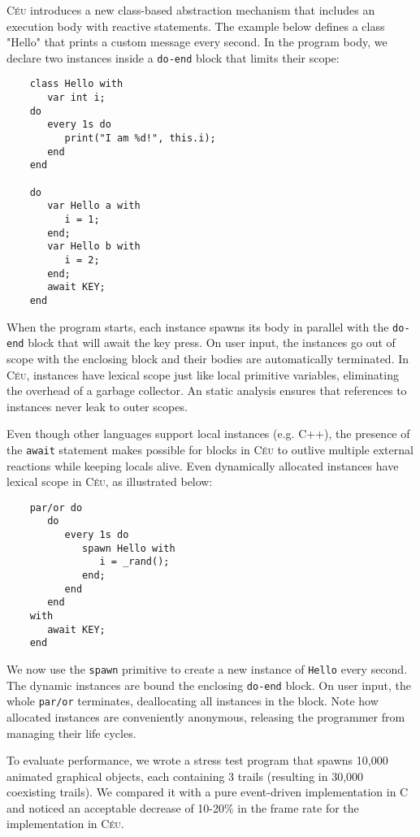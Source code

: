 \documentclass[11pt,a4paper]{article}
\newcommand{\CEU}{\textsc{C\'{e}u}\xspace}
\newcommand{\code}[1] {{\small{\texttt{#1}}}}
\begin{document}
\CEU introduces a new class-based abstraction mechanism that includes an 
execution body with reactive statements.
%
The example below defines a class "Hello" that prints a custom message every 
second.
In the program body, we declare two instances inside a \code{do-end} block that 
limits their scope:

\begin{verbatim}
    class Hello with
       var int i;
    do
       every 1s do
          print("I am %d!", this.i);
       end
    end

    do
       var Hello a with
          i = 1;
       end;
       var Hello b with
          i = 2;
       end;
       await KEY;
    end
\end{verbatim}

When the program starts, each instance spawns its body in parallel with the 
\code{do-end} block that will await the key press.
%
On user input, the instances go out of scope with the enclosing block and their 
bodies are automatically terminated.
%
In \CEU, instances have lexical scope just like local primitive variables, 
eliminating the overhead of a garbage collector.
%
An static analysis ensures that references to instances never leak to outer 
scopes.

Even though other languages support local instances (e.g. C++), the presence of 
the \code{await} statement makes possible for blocks in \CEU to outlive 
multiple external reactions while keeping locals alive.
%
Even dynamically allocated instances have lexical scope in \CEU, as illustrated 
below:

\begin{verbatim}
    par/or do
       do
          every 1s do
             spawn Hello with
                i = _rand();
             end;
          end
       end
    with
       await KEY;
    end
\end{verbatim}

We now use the \code{spawn} primitive to create a new instance of \code{Hello} 
every second.
The dynamic instances are bound the enclosing \code{do-end} block.
On user input, the whole \code{par/or} terminates, deallocating all instances 
in the block.
Note how allocated instances are conveniently anonymous, releasing the 
programmer from managing their life cycles.

To evaluate performance, we wrote a stress test program that spawns 10,000 
animated graphical objects, each containing 3 trails (resulting in 30,000 
coexisting trails).
We compared it with a pure event-driven implementation in C and noticed an 
acceptable decrease of 10-20\% in the frame rate for the implementation in 
\CEU.
\end{document}

